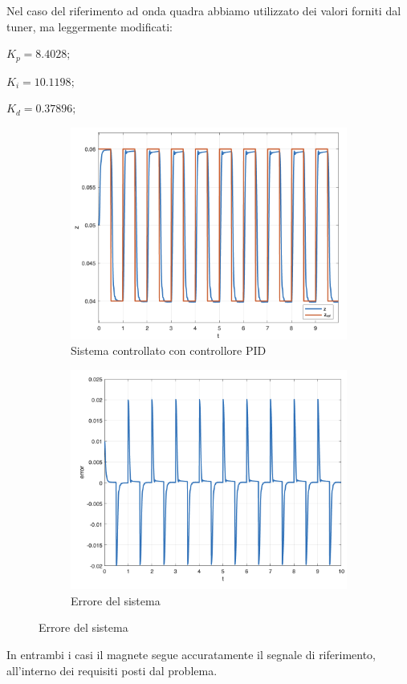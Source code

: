 \documentclass{article}
\newcommand{\spacer}[1][8pt]{
    \par\vspace{#1}
}
\begin{document}
\spacer
Nel caso del riferimento ad onda quadra abbiamo utilizzato dei valori forniti dal tuner, ma leggermente modificati:

$K_p = 8.4028;$

$K_i = 10.1198;$

$K_d = 0.37896;$

\begin{figure}[H]
    \centering
    \begin{minipage}{0.45\textwidth}
        \begin{figure}[H]
            \centering
            \includegraphics[width = 1\textwidth]{Images/square.png}
            \caption{Sistema controllato con controllore PID}
            \label{fig:PID-square}
        \end{figure}
    \end{minipage}
    \hfill
    \begin{minipage}{0.45\textwidth}
        \begin{figure}[H]
            \centering
            \includegraphics[width = 1\textwidth]{Images/square-error.png}
            \caption{Errore del sistema}
            \label{fig:PID-square-error}
        \end{figure}
    \end{minipage}
\end{figure}

In entrambi i casi il magnete segue accuratamente il segnale di riferimento, all'interno dei requisiti posti dal problema.
\end{document}

